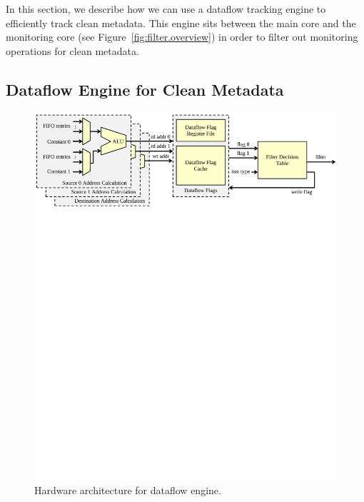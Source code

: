 In this section, we describe how we can use a dataflow tracking engine to
efficiently track clean metadata. This engine sits between the main core and
the monitoring core (see Figure~\ref{fig:filter.overview}) in order to filter
out monitoring operations for clean metadata.

\subsection{Dataflow Engine for Clean Metadata}

\begin{figure}
  \begin{center}
    \includegraphics[width=\linewidth]{figs/dataflow_architecture.pdf}
    \vspace{-0.3in}
    \caption{Hardware architecture for dataflow engine.}
    \label{fig:filter.architecture} 
    \vspace{-0.1in}
  \end{center}
\end{figure}

